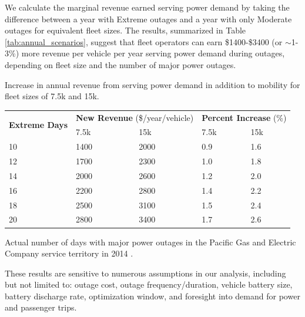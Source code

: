\documentclass[journal]{IEEEtran}
\begin{document}
We calculate the marginal revenue earned serving power demand by taking the difference between a year with Extreme outages and a year with only Moderate outages for equivalent fleet sizes. The results, summarized in Table \ref{tab:annual_scenarios}, suggest that fleet operators can earn \$1400-\$3400 (or $\sim$1-3\%) more revenue per vehicle per year serving power demand during outages, depending on fleet size and the number of major power outages.

\begin{threeparttable}[!htbp]
    \renewcommand{\arraystretch}{1}
    \caption{Increase in annual revenue from serving power demand in addition to mobility for fleet sizes of 7.5k and 15k.}
    \label{tab:annual_scenarios}
    \centering
    \def\colmargin{6.75cm}
    \footnotesize{
    \begin{tabular}{p{1cm}p{1cm}p{1cm}p{1cm}p{1cm}}
    \hline
    \multirow{2}{1cm}{\textbf{Extreme Days}} & \multicolumn{2}{c}{\textbf{New Revenue} (\$/year/vehicle)} & \multicolumn{2}{c}{\textbf{Percent Increase} (\%)} \\
    &7.5k & 15k & 7.5k & 15k \\
    \hline
    10 & 1400 & 2000 & 0.9 & 1.6 \\
    12 & 1700 & 2300 & 1.0 & 1.8 \\
    14 & 2000 & 2600 & 1.2 & 2.0 \\
    16\tnote{\textasteriskcentered} & 2200 & 2800 & 1.4 & 2.2 \\
    18 & 2500 & 3100 & 1.5 & 2.4 \\
    20 & 2800 & 3400 & 1.7 & 2.6 \\
    \hline
    \end{tabular}
      \begin{tablenotes}
        \footnotesize
        \item[\textasteriskcentered] Actual number of days with major power outages in the Pacific Gas and Electric Company service territory in 2014 \cite{pge_reliability_2014}.
      \end{tablenotes}}
\end{threeparttable}

These results are sensitive to numerous assumptions in our analysis, including but not limited to: outage cost, outage frequency/duration, vehicle battery size, battery discharge rate, optimization window, and foresight into demand for power and passenger trips.
\end{document}
